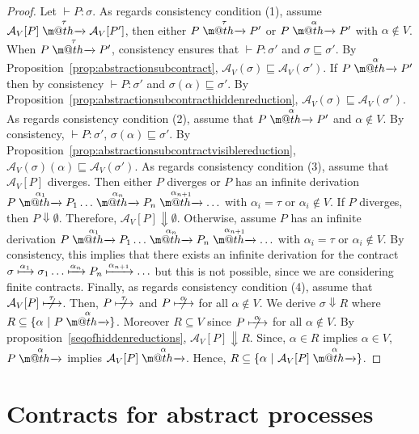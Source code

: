 \documentclass[submission,copyright,creativecommons]{eptcs}
\makeatletter
\newcommand{\tr}[1]{\stackrel{#1}{\rightarrowfill}}
\def \rightarrowfill{\m@th\mathord{\smash-}\mkern-6mu\cleaders\hbox{$\mkern-2mu\mathord{\smash-}\mkern-2mu$}\hfill
  \mkern-6mu\mathord\rightarrow}
\newcommand{\nt}[1]{\centernot{\xmapsto{\ #1\ }}}
\makeatother
\begin{document}
\begin{proof}
   Let $\vdash P:\sigma$. As regards consistency condition (1), assume $\mathcal{A}_V[P]\tr{\tau} \mathcal{A}_V[P']$, then either $P\tr{\tau} P'$ or
$P \tr{\alpha} P'$ with $\alpha\not\in V$. When $P\tr{\tau} P'$, consistency
ensures that $\vdash P :\sigma'$ and  $\sigma \sqsubseteq\sigma'$. By Proposition~\ref{prop:abstractionsubcontract}, $\mathcal{A}_V(\sigma)\sqsubseteq \mathcal{A}_V(\sigma')$. If $P \tr{\alpha} P'$ then by consistency $\vdash P :\sigma'$ and  $\sigma(\alpha) \sqsubseteq\sigma'$. By Proposition~\ref{prop:abstractionsubcontracthiddenreduction}, $\mathcal{A}_V(\sigma)\sqsubseteq \mathcal{A}_V(\sigma')$.   As regards
consistency condition (2), assume that $P\tr{\alpha} P'$ and $\alpha\not\in V$. By consistency, 
$\vdash P :\sigma'$, $\sigma(\alpha)\sqsubseteq\sigma'$. By Proposition~\ref{prop:abstractionsubcontractvisiblereduction}, 
$\mathcal{A}_V(\sigma)(\alpha)\sqsubseteq\mathcal{A}_V(\sigma')$. As regards consistency
condition (3), assume that $\mathcal{A}_V[P]$ diverges. Then either $P$ diverges or $P$ has an infinite 
derivation $P\tr{\alpha_1} P_1 \ldots \tr{\alpha_n} P_n \tr{\alpha_{n+1}} \ldots$ with $\alpha_i = \tau$ or $\alpha_i\not\in V$.
If $P$ diverges, then $P\Downarrow \emptyset$. Therefore, $\mathcal{A}_V[P]\Downarrow \emptyset$. 
Otherwise, assume $P$ has an infinite 
derivation $P\tr{\alpha_1} P_1 \ldots \tr{\alpha_n} P_n \tr{\alpha_{n+1}} \ldots$ with $\alpha_i = \tau$ or $\alpha_i\not\in V$. 
By consistency, this implies that there exists an infinite derivation for the contract $\sigma\xmapsto{\alpha_1}\sigma_1\ldots\xmapsto{\alpha_n}P_n\xmapsto{\alpha_{n+1}}\ldots$ but this is not possible, since we are considering finite contracts.  Finally, as regards consistency condition (4),
assume that $\mathcal{A}_V[P]\nt{\tau}$. Then,  $P\nt{\tau}$ and $P\nt{\alpha}$  for all $\alpha\not\in V$.  We derive $\sigma\Downarrow R$ 
where $R \subseteq \{\alpha \ | \ P \tr{\alpha}\}$. Moreover $R \subseteq V$ since $P\nt{\alpha}$  for all $\alpha\not\in V$. 
By proposition~\ref{seqofhiddenreductions}, $\mathcal{A}_V[P]\Downarrow R$. Since, $\alpha\in R$ implies $\alpha\in V$, $P\tr{\alpha}$
implies $\mathcal{A}_V[P]\tr{\alpha}$. Hence, $R \subseteq \{\alpha \ | \ \mathcal{A}_V[P] \tr{\alpha}\}$.
\end{proof}









\section{Contracts for abstract processes}\label{sec:typesystem}
\end{document}
